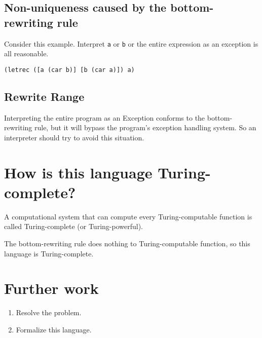 \documentclass[10pt,preprint,numbers]{sigplanconf}
\begin{document}
\subsection{Non-uniqueness caused by the bottom-rewriting rule}

Consider this example. Interpret {\scriptsize\verb|a|} or {\scriptsize\verb|b|} or the entire expression as an exception is all reasonable.
\lstset{language=Lisp}
\begin{lstlisting}[frame=single]
(letrec ([a (car b)] [b (car a)]) a)
\end{lstlisting}

\subsection{Rewrite Range}

Interpreting the entire program as an Exception conforms to the bottom-rewriting rule, but it will bypass the program's exception handling system. So an interpreter should try to avoid this situation.

\section{How is this language Turing-complete?}

A computational system that can compute every Turing-computable function is called Turing-complete (or Turing-powerful).~\citep{wikipedia_Turing_completeness}

The bottom-rewriting rule does nothing to Turing-computable function, so this language is Turing-complete.

\section{Further work}

\begin{enumerate}
\item Resolve the problem.
\item Formalize this language.
\end{enumerate}



\end{document}
